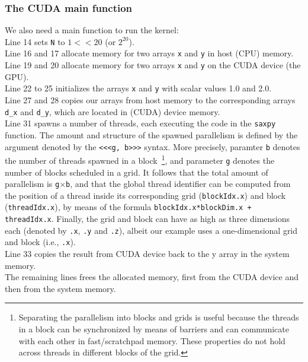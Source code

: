 \subsubsection{The CUDA main function}
We also need a main function to run the kernel:\\
Line 14 sets {\tt N} to $1 << 20$ (or $2^{20}$).\\
Line 16 and 17 allocate memory for two arrays {\tt x} and {\tt y} in host (CPU) memory.\\
Line 19 and 20 allocate memory for two arrays {\tt x} and {\tt y} on the CUDA device (the GPU).\\
Line 22 to 25 initializes the arrays {\tt x} and {\tt y} with scalar values 1.0 and 2.0.\\
Line 27 and 28 copies our arrays from host memory to the corresponding arrays 
{\tt d\_x} and {\tt d\_y}, which are located in (CUDA) device memory.\\
Line 31 spawns a number of threads, each executing the code in the 
\texttt{saxpy} function. The amount and structure of the spawned parallelism 
is defined by the argument denoted by the {\tt <<<g, b>>>} syntax. More precisely,
paramter {\tt b} denotes the number of threads spawned in a block~\footnote{
Separating the parallelism into blocks and grids is useful because the threads
in a block can be synchronized by means of barriers and can communicate with
each other in fast/scratchpad memory. These properties do not hold across threads
in different blocks of the grid. 
}, and parameter
{\tt g} denotes the number of blocks scheduled in a grid.
It follows that the total amount of parallelism
is {\tt g$\times$b}, and that the global thread identifier can be computed
from the position of a thread inside its corresponding grid ({\tt blockIdx.x}) 
and block ({\tt threadIdx.x}), by means of the formula 
{\tt blockIdx.x*blockDim.x + threadIdx.x}.
Finally, the grid and block can have as high as three dimensions each (denoted by 
{\tt .x}, {\tt .y} and {\tt .z}), albeit our example uses a one-dimensional
grid and block (i.e., {\tt .x}).
\\
Line 33 copies the result from CUDA device back to the y array in the system
memory. \\
The remaining lines frees the allocated memory, first from the CUDA device and
then from the system memory.



